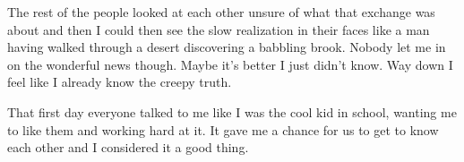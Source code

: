 The rest of the people looked at each other unsure of what that exchange was about and then I could then see the slow realization in their faces like a man having walked through a desert discovering a babbling brook. Nobody let me in on the wonderful news though. Maybe it's better I just didn't know. Way down I feel like I already know the creepy truth.

That first day everyone talked to me like I was the cool kid in school, wanting me to like them and working hard at it. It gave me a chance for us to get to know each other and I considered it a good thing.





 


 
 
 
 
 
 